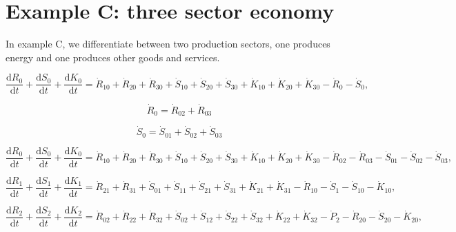 \section{Example C: three sector economy}
\label{sec:C_materials}

In example C, we differentiate between two production sectors, one produces energy and one produces other goods and services.


\begin{equation} \label{eq:C-CV_R_dot_0a}
	\frac{\mathrm{d}R_{0}}{\mathrm{d}t} 
	+ \frac{\mathrm{d}S_{0}}{\mathrm{d}t}	
	+ \frac{\mathrm{d}K_0}{\mathrm{d}t}
	=  \dot{R}_{10} + \dot{R}_{20} + \dot{R}_{30}
	+ \dot{S}_{10} + \dot{S}_{20} + \dot{S}_{30}
	+ \dot{K}_{10} + \dot{K}_{20} + \dot{K}_{30}
	- \dot{R}_{0} 
	- \dot{S}_{0},
\end{equation}

\begin{equation}
	\dot{R}_{0} = \dot{R}_{02} + \dot{R}_{03}
\end{equation}

\begin{equation}
	\dot{S}_{0} = \dot{S}_{01} + \dot{S}_{02} + \dot{S}_{03}
\end{equation}

 \begin{equation} \label{eq:C-CV_R_dot_0b}
 	\frac{\mathrm{d}R_{0}}{\mathrm{d}t} 
 	+ \frac{\mathrm{d}S_{0}}{\mathrm{d}t}	
 	+ \frac{\mathrm{d}K_0}{\mathrm{d}t}
 	=  \dot{R}_{10} + \dot{R}_{20} + \dot{R}_{30}
 	+ \dot{S}_{10} + \dot{S}_{20} + \dot{S}_{30}
 	+ \dot{K}_{10} + \dot{K}_{20} + \dot{K}_{30}
 	- \dot{R}_{02} - \dot{R}_{03} 
 	- \dot{S}_{01} - \dot{S}_{02} - \dot{S}_{03},
 \end{equation}
 
 \begin{equation} \label{eq:C-CV_R_dot_1}
 	\frac{\mathrm{d}R_{1}}{\mathrm{d}t} 
	+ \frac{\mathrm{d}S_{1}}{\mathrm{d}t}
 	+ \frac{\mathrm{d}K_{1}}{\mathrm{d}t}
 	=  \dot{R}_{21} + \dot{R}_{31}
 	+ \dot{S}_{01} + \dot{S}_{11} 
	+ \dot{S}_{21} + \dot{S}_{31}
 	+ \dot{K}_{21} + \dot{K}_{31}
 	- \dot{R}_{10} 
 	- \dot{S}_{1} - \dot{S}_{10} 
 	- \dot{K}_{10},
 \end{equation}
 
 \begin{equation} \label{eq:C-CV_R_dot_2}
 	\frac{\mathrm{d}R_{2}}{\mathrm{d}t} 
	+ \frac{\mathrm{d}S_{2}}{\mathrm{d}t}
 	+ \frac{\mathrm{d}K_{2}}{\mathrm{d}t}
 	=  \dot{R}_{02} + \dot{R}_{22} + \dot{R}_{32}
 	+ \dot{S}_{02} + \dot{S}_{12} + \dot{S}_{22} + \dot{S}_{32} 
 	+ \dot{K}_{22} + \dot{K}_{32}
 	- \dot{P}_{2}
 	- \dot{R}_{20} 
 	- \dot{S}_{20} 
 	- \dot{K}_{20},
 \end{equation}
 
